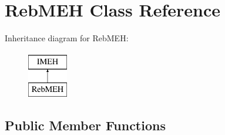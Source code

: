 \hypertarget{class_reb_m_e_h}{}\section{Reb\+M\+EH Class Reference}
\label{class_reb_m_e_h}
Inheritance diagram for Reb\+M\+EH\+:\begin{figure}[H]
\begin{center}
\leavevmode
\includegraphics[height=2.000000cm]{class_reb_m_e_h}
\end{center}
\end{figure}
\subsection*{Public Member Functions}
